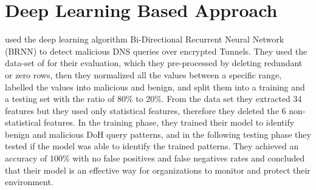 \section{Deep Learning Based Approach} \label{dl}
\cite{AlFawaRehEtAl_DetectingMaliciousDNSQueriesBRNN} used the deep learning algorithm Bi-Directional Recurrent Neural Network (BRNN) to detect malicious DNS queries over encrypted Tunnels. They used the data-set of \cite{montazerishatoori2020anomaly} for their evaluation, which they pre-processed by deleting redundant or zero rows, then they normalized all the values between a specific range, labelled the values into malicious and benign, and split them into a training and a testing set with the ratio of 80\% to 20\%. From the data set they extracted 34 features but they used only statistical features, therefore they deleted the 6 non-statistical features. In the training phase, they trained their model to identify benign and malicious DoH query patterns, and in the following testing phase they tested if the model was able to identify the trained patterns. They achieved an accuracy of 100\% with no false positives and false negatives rates and concluded that their model is an effective way for organizations to monitor and protect their environment.

